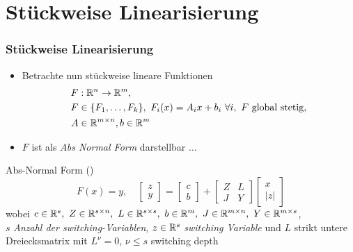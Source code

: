 \section[Stückweise Linearisierung]{Stückweise Linearisierung}
\begin{frame}[<+->]
\frametitle{Stückweise Linearisierung}
\begin{itemize}
\item Betrachte nun stückweise lineare Funktionen 
\[
\begin{aligned}
 F&:\mathbb R^n \to \mathbb R^m, \\
 F&\in \lbrace F_1,\ldots,F_k\rbrace,~F_i(x)=A_ix+b_i~\forall i,~F\text{ global stetig}, \\
 A&\in\mathbb R^{m\times n},b\in\mathbb R^m
 \end{aligned}
\]
 \item $F$ ist als \textit{Abs Normal Form} darstellbar $\ldots$
 \end{itemize}
\begin{block}{Abs-Normal Form (\cite{plan})}
 \begin{equation}
\label{eq:absNormalForm}
F(x) = y,\quad 
  \begin{bmatrix}
   z\\y
  \end{bmatrix}
  =
  \begin{bmatrix}
   c\\b
  \end{bmatrix}
  +
  \begin{bmatrix}
   Z & L\\
   J & Y
  \end{bmatrix}
  \begin{bmatrix}
   x\\|z|
  \end{bmatrix}
 \end{equation}
wobei $c\in \mathbb R^s, ~ Z\in \mathbb R^{s\times n},~ L\in\mathbb R^{s\times s}, ~ b\in\mathbb R^m, ~ J\in\mathbb R^{m\times n}, ~ Y\in \mathbb R^{m\times s}$,\\
$s$ \textit{Anzahl der switching-Variablen}, $z\in \mathbb R^s$ \textit{switching Variable} und $L$ strikt untere Dreiecksmatrix mit $L^\nu=0$, $\nu \leq s$ switching depth
\end{block}
\end{frame}

